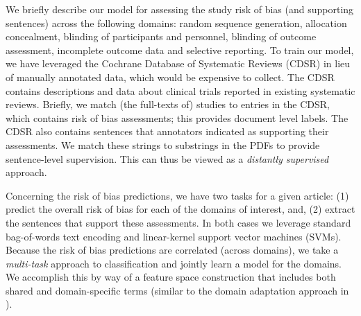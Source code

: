 \documentclass[runningheads,a4paper]{llncs}
\begin{document}
We briefly describe our model for assessing the study risk of bias (and supporting sentences) across the following domains: random sequence generation, allocation concealment, blinding of participants and personnel, blinding of outcome assessment, incomplete outcome data and selective reporting. 
To train our model, we have leveraged the Cochrane Database of Systematic Reviews (CDSR) in lieu of manually annotated data, which would be expensive to collect. 
The CDSR contains descriptions and data about clinical trials reported in existing systematic reviews. 
Briefly, we match (the full-texts of) studies to entries in the CDSR, which contains risk of bias assessments; this provides document level labels. 
The CDSR also contains sentences that annotators indicated as supporting their assessments. 
We match these strings to substrings in the PDFs to provide sentence-level supervision. 
This can thus be viewed as a \emph{distantly supervised} \cite{mintz-09,nguyen-11} approach.
 
Concerning the risk of bias predictions, we have two tasks for a given article: (1) predict the overall risk of bias for each of the domains of interest, and, (2) extract the sentences that support these assessments. 
In both cases we leverage standard bag-of-words text encoding and linear-kernel support vector machines (SVMs). 
Because the risk of bias predictions are correlated (across domains), we take a \emph{multi-task} \cite{evgeniou2004} approach to classification and jointly learn a model for the domains. 
We accomplish this by way of a feature space construction that includes both shared and domain-specific terms (similar to the domain adaptation approach in \cite{daume2007}). 
\end{document}
